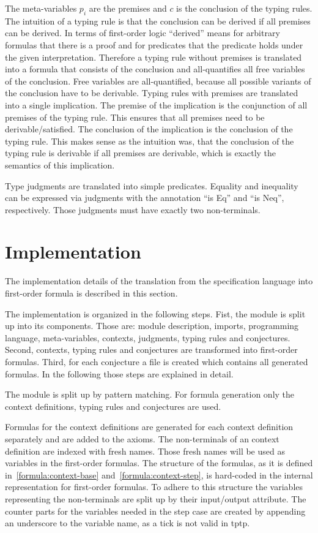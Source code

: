 The meta-variables $p_i$ are the premises and $c$ is the conclusion of
the typing rules. The intuition of a typing rule is that the
conclusion can be derived if all premises can be derived. In terms of
first-order logic ``derived'' means for arbitrary formulas that there
is a proof and for predicates that the predicate holds under the given
interpretation. Therefore a typing rule without premises is translated
into a formula that consists of the conclusion and all-quantifies all
free variables of the conclusion. Free variables are all-quantified,
because all possible variants of the conclusion have to be derivable.
Typing rules with premises are translated into a single
implication. The premise of the implication is the conjunction of all
premises of the typing rule. This ensures that all premises need to be
derivable/satisfied. The conclusion of the implication is the
conclusion of the typing rule. This makes sense as the intuition was,
that the conclusion of the typing rule is derivable if all premises
are derivable, which is exactly the semantics of this implication.

Type judgments are translated into simple predicates. Equality and
inequality can be expressed via judgments with the annotation ``is
Eq'' and ``is Neq'', respectively. Those judgments must have exactly
two non-terminals.
\section{Implementation}
\label{sec:implementation-fof}
The implementation details of the translation from the specification
language into first-order formula is described in this section.

The implementation is organized in the following steps. Fist, the
module is split up into its components. Those are: module description,
imports, programming language, meta-variables, contexts,
judgments, typing rules and conjectures. Second, contexts, typing
rules and conjectures are transformed into first-order
formulas. Third, for each conjecture a file is created which contains
all generated formulas. In the following those steps are explained in
detail.

The module is split up by pattern matching. For formula generation
only the context definitions, typing rules and conjectures are
used.

Formulas for the context definitions are generated for each context
definition separately and are added to the axioms. The non-terminals
of an context definition are indexed with fresh names. Those fresh
names will be used as variables in the first-order formulas. The
structure of the formulas, as it is defined
in~\ref{formula:context-base} and~\ref{formula:context-step}, is
hard-coded in the internal representation for first-order formulas. To
adhere to this structure the variables representing the non-terminals
are split up by their input/output attribute. The counter parts for
the variables needed in the step case are created by appending an
underscore to the variable name, as a tick is not valid in \gls{tptp}.

